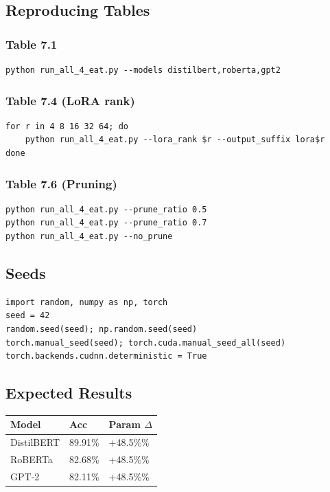 \subsection{Reproducing Tables}

\subsubsection{Table 7.1}

\begin{lstlisting}
python run_all_4_eat.py --models distilbert,roberta,gpt2
\end{lstlisting}

\subsubsection{Table 7.4 (LoRA rank)}

\begin{lstlisting}
for r in 4 8 16 32 64; do
    python run_all_4_eat.py --lora_rank $r --output_suffix lora$r
done
\end{lstlisting}

\subsubsection{Table 7.6 (Pruning)}

\begin{lstlisting}
python run_all_4_eat.py --prune_ratio 0.5
python run_all_4_eat.py --prune_ratio 0.7
python run_all_4_eat.py --no_prune
\end{lstlisting}

\subsection{Seeds}

\begin{lstlisting}
import random, numpy as np, torch
seed = 42
random.seed(seed); np.random.seed(seed)
torch.manual_seed(seed); torch.cuda.manual_seed_all(seed)
torch.backends.cudnn.deterministic = True
\end{lstlisting}

\subsection{Expected Results}

\begin{table}[H]
\centering
\small
\begin{tabular}{lll}
\toprule
\textbf{Model} & \textbf{Acc} & \textbf{Param $\Delta$} \\
\midrule
DistilBERT & 89.91\% & +48.5\%\% \\
RoBERTa & 82.68\% & +48.5\%\% \\
GPT-2 & 82.11\% & +48.5\%\% \\
\bottomrule
\end{tabular}
\end{table}

